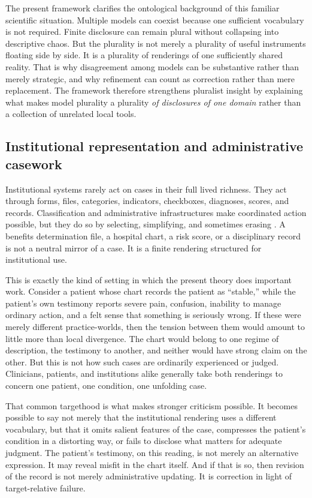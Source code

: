 \documentclass[11pt]{article}
\renewcommand{\emph}[1]{\textit{#1}}
\begin{document}
The present framework clarifies the ontological background of this familiar scientific situation. Multiple models can coexist because one sufficient vocabulary is not required. Finite disclosure can remain plural without collapsing into descriptive chaos. But the plurality is not merely a plurality of useful instruments floating side by side. It is a plurality of renderings of one sufficiently shared reality. That is why disagreement among models can be substantive rather than merely strategic, and why refinement can count as correction rather than mere replacement. The framework therefore strengthens pluralist insight by explaining what makes model plurality a plurality \emph{of disclosures of one domain} rather than a collection of unrelated local tools.

\subsection{Institutional representation and administrative casework}

Institutional systems rarely act on cases in their full lived richness. They act through forms, files, categories, indicators, checkboxes, diagnoses, scores, and records. Classification and administrative infrastructures make coordinated action possible, but they do so by selecting, simplifying, and sometimes erasing \cite{BowkerStar1999SortingThingsOut}. A benefits determination file, a hospital chart, a risk score, or a disciplinary record is not a neutral mirror of a case. It is a finite rendering structured for institutional use.

This is exactly the kind of setting in which the present theory does important work. Consider a patient whose chart records the patient as ``stable,'' while the patient's own testimony reports severe pain, confusion, inability to manage ordinary action, and a felt sense that something is seriously wrong. If these were merely different practice-worlds, then the tension between them would amount to little more than local divergence. The chart would belong to one regime of description, the testimony to another, and neither would have strong claim on the other. But this is not how such cases are ordinarily experienced or judged. Clinicians, patients, and institutions alike generally take both renderings to concern one patient, one condition, one unfolding case.

That common targethood is what makes stronger criticism possible. It becomes possible to say not merely that the institutional rendering uses a different vocabulary, but that it omits salient features of the case, compresses the patient's condition in a distorting way, or fails to disclose what matters for adequate judgment. The patient's testimony, on this reading, is not merely an alternative expression. It may reveal misfit in the chart itself. And if that is so, then revision of the record is not merely administrative updating. It is correction in light of target-relative failure.
\end{document}
